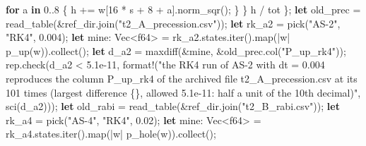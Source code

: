 \documentclass[
  10pt,
]{article}
\newenvironment{Shaded}{}{}
\newcommand{\ControlFlowTok}[1]{\textcolor[rgb]{0.00,0.44,0.13}{\textbf{#1}}}
\newcommand{\DataTypeTok}[1]{\textcolor[rgb]{0.56,0.13,0.00}{#1}}
\newcommand{\DecValTok}[1]{\textcolor[rgb]{0.25,0.63,0.44}{#1}}
\newcommand{\KeywordTok}[1]{\textcolor[rgb]{0.00,0.44,0.13}{\textbf{#1}}}
\newcommand{\NormalTok}[1]{#1}
\newcommand{\OperatorTok}[1]{\textcolor[rgb]{0.40,0.40,0.40}{#1}}
\newcommand{\PreprocessorTok}[1]{\textcolor[rgb]{0.74,0.48,0.00}{#1}}
\newcommand{\StringTok}[1]{\textcolor[rgb]{0.25,0.44,0.63}{#1}}
\begin{document}
\begin{Shaded}
\begin{Highlighting}[]
            \ControlFlowTok{for}\NormalTok{ a }\KeywordTok{in} \DecValTok{0}\OperatorTok{..}\DecValTok{8} \OperatorTok{\{}
\NormalTok{                h }\OperatorTok{+=}\NormalTok{ w[}\DecValTok{16} \OperatorTok{*}\NormalTok{ s }\OperatorTok{+} \DecValTok{8} \OperatorTok{+}\NormalTok{ a]}\OperatorTok{.}\NormalTok{norm\_sqr()}\OperatorTok{;}
            \OperatorTok{\}}
        \OperatorTok{\}}
\NormalTok{        h }\OperatorTok{/}\NormalTok{ tot}
    \OperatorTok{\};}
    \KeywordTok{let}\NormalTok{ old\_prec }\OperatorTok{=}\NormalTok{ read\_table(}\OperatorTok{\&}\NormalTok{ref\_dir}\OperatorTok{.}\NormalTok{join(}\StringTok{"t2\_A\_precession.csv"}\NormalTok{))}\OperatorTok{;}
    \KeywordTok{let}\NormalTok{ rk\_a2 }\OperatorTok{=}\NormalTok{ pick(}\StringTok{"AS{-}2"}\OperatorTok{,} \StringTok{"RK4"}\OperatorTok{,} \DecValTok{0.004}\NormalTok{)}\OperatorTok{;}
    \KeywordTok{let}\NormalTok{ mine}\OperatorTok{:} \DataTypeTok{Vec}\OperatorTok{\textless{}}\DataTypeTok{f64}\OperatorTok{\textgreater{}} \OperatorTok{=}\NormalTok{ rk\_a2}\OperatorTok{.}\NormalTok{states}\OperatorTok{.}\NormalTok{iter()}\OperatorTok{.}\NormalTok{map(}\OperatorTok{|}\NormalTok{w}\OperatorTok{|}\NormalTok{ p\_up(w))}\OperatorTok{.}\NormalTok{collect()}\OperatorTok{;}
    \KeywordTok{let}\NormalTok{ d\_a2 }\OperatorTok{=}\NormalTok{ maxdiff(}\OperatorTok{\&}\NormalTok{mine}\OperatorTok{,} \OperatorTok{\&}\NormalTok{old\_prec}\OperatorTok{.}\NormalTok{col(}\StringTok{"P\_up\_rk4"}\NormalTok{))}\OperatorTok{;}
\NormalTok{    rep}\OperatorTok{.}\NormalTok{check(d\_a2 }\OperatorTok{\textless{}} \DecValTok{5.1e{-}11}\OperatorTok{,} \PreprocessorTok{format!}\NormalTok{(}\StringTok{"the RK4 run of AS{-}2 with dt = 0.004 reproduces the column P\_up\_rk4 of the archived file t2\_A\_precession.csv at its 101 times (largest difference \{\}, allowed 5.1e{-}11: half a unit of the 10th decimal)"}\OperatorTok{,}\NormalTok{ sci(d\_a2)))}\OperatorTok{;}
    \KeywordTok{let}\NormalTok{ old\_rabi }\OperatorTok{=}\NormalTok{ read\_table(}\OperatorTok{\&}\NormalTok{ref\_dir}\OperatorTok{.}\NormalTok{join(}\StringTok{"t2\_B\_rabi.csv"}\NormalTok{))}\OperatorTok{;}
    \KeywordTok{let}\NormalTok{ rk\_a4 }\OperatorTok{=}\NormalTok{ pick(}\StringTok{"AS{-}4"}\OperatorTok{,} \StringTok{"RK4"}\OperatorTok{,} \DecValTok{0.02}\NormalTok{)}\OperatorTok{;}
    \KeywordTok{let}\NormalTok{ mine}\OperatorTok{:} \DataTypeTok{Vec}\OperatorTok{\textless{}}\DataTypeTok{f64}\OperatorTok{\textgreater{}} \OperatorTok{=}\NormalTok{ rk\_a4}\OperatorTok{.}\NormalTok{states}\OperatorTok{.}\NormalTok{iter()}\OperatorTok{.}\NormalTok{map(}\OperatorTok{|}\NormalTok{w}\OperatorTok{|}\NormalTok{ p\_hole(w))}\OperatorTok{.}\NormalTok{collect()}\OperatorTok{;}

\end{Highlighting}
\end{Shaded}
\end{document}
